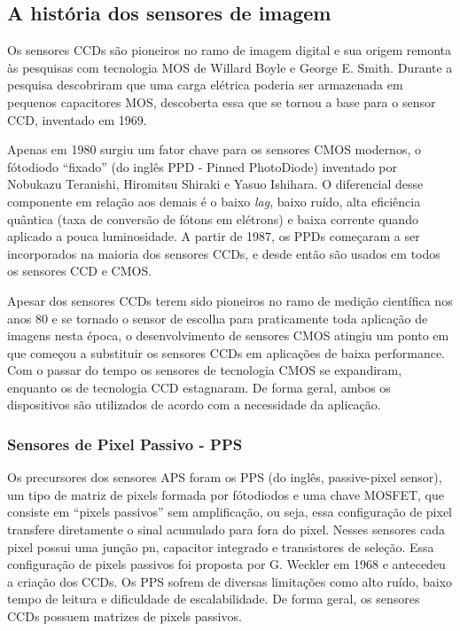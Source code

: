 \documentclass[11pt,a4paper,twocolumn]{article}
\begin{document}
	\subsection*{A história dos sensores de imagem}
		Os sensores CCDs são pioneiros no ramo de imagem digital e sua origem remonta às pesquisas com tecnologia MOS de Willard Boyle e George E. Smith. Durante a pesquisa descobriram que uma carga elétrica poderia ser armazenada em pequenos capacitores MOS, descoberta essa que se tornou a base para o sensor CCD, inventado em 1969.
		
		Apenas em 1980 surgiu um fator chave para os sensores CMOS modernos, o fótodiodo ``fixado'' (do inglês PPD - Pinned PhotoDiode) inventado por Nobukazu Teranishi, Hiromitsu Shiraki e Yasuo Ishihara. O diferencial desse componente em relação aos demais é o baixo \textit{lag}, baixo ruído, alta eficiência quântica (taxa de conversão de fótons em elétrons) e baixa corrente quando aplicado a pouca luminosidade. A partir de 1987, os PPDs começaram a ser incorporados na maioria dos sensores CCDs, e desde então são usados em todos os sensores CCD e CMOS.
	
		Apesar dos sensores CCDs terem sido pioneiros no ramo de medição científica nos anos 80 e se tornado o sensor de escolha para praticamente toda aplicação de imagens nesta época, o desenvolvimento de sensores CMOS atingiu um ponto em que começou a substituir os sensores CCDs em aplicações de baixa performance. Com o passar do tempo os sensores de tecnologia CMOS se expandiram, enquanto os de tecnologia CCD estagnaram. De forma geral, ambos os dispositivos são utilizados de acordo com a necessidade da aplicação.
		
	\subsubsection*{Sensores de Pixel Passivo - PPS} 
		Os precursores dos sensores APS foram os PPS (do inglês, passive-pixel sensor), um tipo de matriz de pixels formada por fótodiodos e uma chave MOSFET, que consiste em ``pixels passivos'' sem amplificação, ou seja, essa configuração de pixel transfere diretamente o sinal acumulado para fora do pixel. Nesses sensores cada pixel possui uma junção pn, capacitor integrado e transistores de seleção. Essa configuração de pixels passivos foi proposta por G. Weckler em 1968 e antecedeu a criação dos CCDs. Os PPS sofrem de diversas limitações como alto ruído, baixo tempo de leitura e dificuldade de escalabilidade. De forma geral, os sensores CCDs possuem matrizes de pixels passivos.
		
\end{document}
